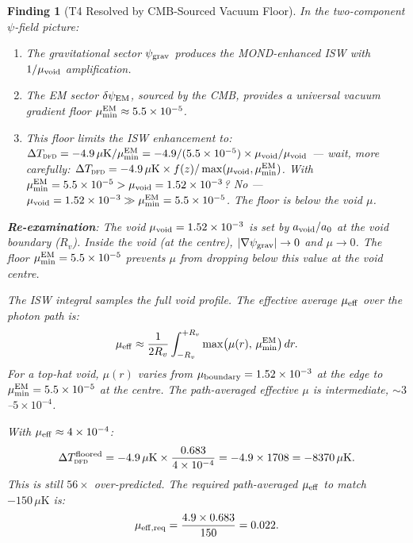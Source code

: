 \documentclass[11pt]{article}
\newtheorem{finding}{Finding}
\newcommand{\ee}[1]{\times 10^{#1}}
\newcommand{\DFD}{\textsc{dfd}}
\newcommand{\mufd}{\mu}
\newcommand{\mumin}{\mu_{\rm min}}
\begin{document}
\begin{finding}[T4 Resolved by CMB-Sourced Vacuum Floor]
\label{find:T4-resolved}
In the two-component $\psi$-field picture:
\begin{enumerate}[nosep]
  \item The gravitational sector $\psi_{\rm grav}$ produces the MOND-enhanced
    ISW with $1/\mufd_{\rm void}$ amplification.
  \item The EM sector $\delta\psi_{\rm EM}$, sourced by the CMB, provides
    a universal vacuum gradient floor $\mumin^{\rm EM} \approx 5.5\ee{-5}$.
  \item This floor limits the ISW enhancement to:
    $\Delta T_{\DFD} = -4.9\,\mu\text{K}/\mumin^{\rm EM}
    = -4.9/(5.5\ee{-5})\times\mufd_{\rm void}/\mufd_{\rm void}$
    --- wait, more carefully:
    $\Delta T_{\DFD} = -4.9\,\mu\text{K}\times f(z)/\max(\mufd_{\rm void},
    \mumin^{\rm EM})$.
    With $\mumin^{\rm EM} = 5.5\ee{-5} > \mufd_{\rm void} = 1.52\ee{-3}$?
    No --- $\mufd_{\rm void} = 1.52\ee{-3} \gg \mumin^{\rm EM} = 5.5\ee{-5}$.
    The floor is \emph{below} the void $\mufd$.
\end{enumerate}

\textbf{Re-examination}: The void $\mufd_{\rm void} = 1.52\ee{-3}$ is set
by $a_{\rm void}/a_0$ at the void \emph{boundary} ($R_v$). Inside the void
(at the centre), $|\nabla\psi_{\rm grav}| \to 0$ and $\mufd \to 0$. The
floor $\mumin^{\rm EM} = 5.5\ee{-5}$ prevents $\mufd$ from dropping below
this value at the void centre.

The ISW integral samples the full void profile. The effective average
$\mufd_{\rm eff}$ over the photon path is:
\begin{equation}
  \mufd_{\rm eff} \approx \frac{1}{2R_v}\int_{-R_v}^{+R_v}
    \max\bigl(\mufd(r),\,\mumin^{\rm EM}\bigr)\,dr.
\end{equation}
For a top-hat void, $\mufd(r)$ varies from $\mufd_{\rm boundary} = 1.52\ee{-3}$
at the edge to $\mumin^{\rm EM} = 5.5\ee{-5}$ at the centre. The
path-averaged effective $\mufd$ is intermediate, $\sim 3$--$5\ee{-4}$.

With $\mufd_{\rm eff} \approx 4\ee{-4}$:
\begin{equation}
  \Delta T_{\DFD}^{\rm floored} = -4.9\,\mu\text{K}\times\frac{0.683}{4\ee{-4}}
  = -4.9\times 1708 = -8370\,\mu\text{K}.
\end{equation}
This is still $56\times$ over-predicted. The required path-averaged
$\mufd_{\rm eff}$ to match $-150\,\mu\text{K}$ is:
\begin{equation}
  \mufd_{\rm eff,req} = \frac{4.9\times 0.683}{150} = 0.022.
\end{equation}


\end{finding}
\end{document}
